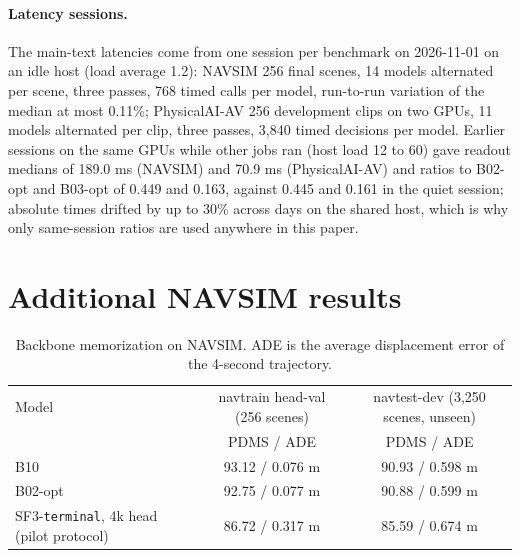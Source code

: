 \documentclass[10pt]{article}
\newcommand{\terminal}{\texttt{terminal}}
\begin{document}
\paragraph{Latency sessions.} The main-text latencies come from one session per benchmark on 2026-11-01 on an idle host (load average 1.2): NAVSIM 256 final scenes, 14 models alternated per scene, three passes, 768 timed calls per model, run-to-run variation of the median at most 0.11\%; PhysicalAI-AV 256 development clips on two GPUs, 11 models alternated per clip, three passes, 3,840 timed decisions per model. Earlier sessions on the same GPUs while other jobs ran (host load 12 to 60) gave readout medians of 189.0 ms (NAVSIM) and 70.9 ms (PhysicalAI-AV) and ratios to B02-opt and B03-opt of 0.449 and 0.163, against 0.445 and 0.161 in the quiet session; absolute times drifted by up to 30\% across days on the shared host, which is why only same-session ratios are used anywhere in this paper.

\section{Additional NAVSIM results}
\label{app:navsim-dev}

\begin{table}[H]
\caption{Backbone memorization on NAVSIM. ADE is the average displacement error of the 4-second trajectory.}
\label{tab:memo}
\begin{center}
\small
\begin{tabular}{lcc}
\toprule
Model & navtrain head-val (256 scenes) & navtest-dev (3,250 scenes, unseen) \\
 & PDMS / ADE & PDMS / ADE \\
\midrule
B10 & 93.12 / 0.076 m & 90.93 / 0.598 m \\
B02-opt & 92.75 / 0.077 m & 90.88 / 0.599 m \\
SF3-\terminal{}, 4k head (pilot protocol) & 86.72 / 0.317 m & 85.59 / 0.674 m \\
\bottomrule
\end{tabular}
\end{center}
\end{table}
\end{document}
